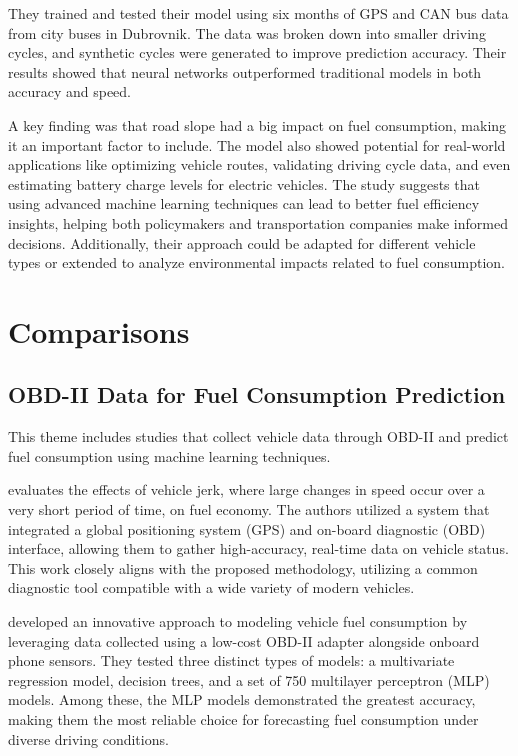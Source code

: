 \documentclass[letterpaper]{article}
\begin{document}
They trained and tested their model using six months of GPS and CAN bus data from city buses 
in Dubrovnik. The data was broken down into smaller driving cycles, and synthetic cycles 
were generated to improve prediction accuracy. Their results showed that neural networks 
outperformed traditional models in both accuracy and speed. 

A key finding was that road slope had a big impact on fuel consumption, making it an 
important factor to include. The model also showed potential for real-world applications 
like optimizing vehicle routes, validating driving cycle data, and even estimating battery
charge levels for electric vehicles. The study suggests that using advanced machine learning 
techniques can lead to better fuel efficiency insights, helping both policymakers and 
transportation companies make informed decisions. Additionally, their approach could be 
adapted for different vehicle types or extended to analyze environmental impacts related 
to fuel consumption.

\section*{Comparisons}


\subsection*{OBD-II Data for Fuel Consumption Prediction}

This theme includes studies that collect vehicle data through OBD-II and predict
fuel consumption using machine learning techniques. 

\cite{zhang2023novel} evaluates the effects of vehicle jerk, where large changes in speed 
occur over a very short period of time, on fuel economy. The authors utilized a system that 
integrated a global positioning system (GPS) and on-board diagnostic (OBD) interface, allowing 
them to gather high-accuracy, real-time data on vehicle status. This work closely aligns with 
the proposed methodology, utilizing a common diagnostic tool compatible with a wide variety of 
modern vehicles. 

\cite{rykala2023modeling} developed an innovative approach to modeling vehicle fuel consumption 
by leveraging data collected using a low-cost OBD-II adapter alongside onboard phone sensors. 
They tested three distinct types of models: a multivariate regression model, decision trees, 
and a set of 750 multilayer perceptron (MLP) models. Among these, the MLP models demonstrated 
the greatest accuracy, making them the most reliable choice for forecasting fuel consumption 
under diverse driving conditions. 
\end{document}

